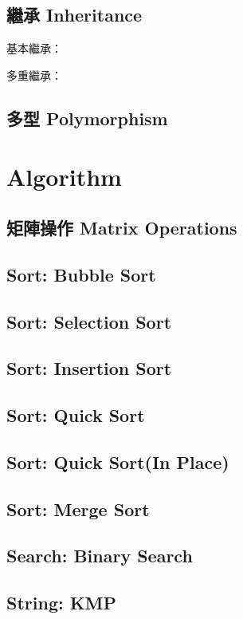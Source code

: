 \documentclass[a4paper,10pt,twocolumn,oneside]{article}
\begin{document}
\subsection{繼承 Inheritance}
基本繼承：

多重繼承：

\subsection{多型 Polymorphism}


\section{Algorithm}
\subsection{矩陣操作 Matrix Operations}

\subsection{Sort: Bubble Sort}

\subsection{Sort: Selection Sort}

\subsection{Sort: Insertion Sort}

\subsection{Sort: Quick Sort}

\subsection{Sort: Quick Sort(In Place)}

\subsection{Sort: Merge Sort}

\subsection{Search: Binary Search}

\subsection{String: KMP}

\end{document}
